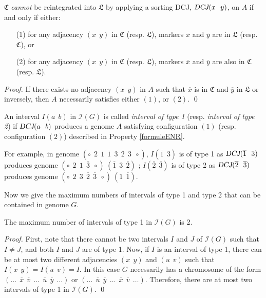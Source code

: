 \documentclass{llncs}
\newcommand{\fst}[1]{ \ensuremath{#1} }
\newcommand{\snd}[1]{ \ensuremath{\overline{#1}} }
\newcommand\aff[2]{\ensuremath{(\fst{#1}~~\fst{#2})}}
\newcommand\asf[2]{\ensuremath{(\snd{#1}~~\fst{#2})}}
\newcommand\ass[2]{\ensuremath{(\snd{#1}~~\snd{#2})}}
\def\DCJ{\ensuremath{\mbox{\sl DCJ}}}
\begin{document}
\begin{property}
$\mathfrak{C}$ \emph{cannot} be reintegrated into $\mathfrak{L}$ by
applying a sorting DCJ,  $\DCJ\aff{x}{y}$, on $A$ if and only if either:

\begin{itemize} 
\item[(1)] for any adjacency $\aff{x}{y}$ in $\mathfrak{C}$
  (resp. $\mathfrak{L}$), markers $\snd{x}$ and $\snd{y}$ are in
  $\mathfrak{L}$ (resp. $\mathfrak{C}$), or

\item[(2)] for any adjacency $\aff{x}{y}$ in $\mathfrak{C}$ (resp. $\mathfrak{L}$), markers $\snd{x}$ and $\snd{y}$ are also in $\mathfrak{C}$ (resp. $\mathfrak{L}$). \end{itemize}

\label{formuleENR}
\end{property}
\begin{proof}
If there exists no  adjacency $\aff{x}{y}$ in $A$ such that $\snd{x}$ is in $\mathfrak{C}$ and $\snd{y}$ in $\mathfrak{L}$ or inversely, then $A$ necessarily satisfies either $(1)$, or $(2)$. \qed
\end{proof}






\begin{definition}
An interval $I\aff{a}{b}$ in  $\mathcal{I}(G)$ is called
\emph{interval of type 1} (resp. \emph{interval of type 2}) if $\DCJ\aff{a}{b}$ produces a genome $A$ satisfying configuration $(1)$  (resp.  configuration $(2)$) described in Property \ref{formuleENR}.
\end{definition}


For example, in genome  $(\circ~~\fst{2}~~\fst{1}~~\snd{1}~~\fst{3}~~\snd{2}~~\snd{3}~~\circ)$,  $I\asf{1}{3}$ is of type 1 as  $\DCJ\asf{1}{3}$ produces genome 
$(\circ~~\fst{2}~~\fst{1}~~\snd{3}~~\circ) ~ (\snd{1}~~\fst{3}~~\snd{2})$ ;  $I\ass{2}{3}$ is of type 2 as  $\DCJ\ass{2}{3}$ produces genome  $(\circ~~\fst{2}~~\fst{3}~~\snd{2}~~\snd{3}~~\circ) ~ (\fst{1}~~\snd{1})$.

Now we give the maximum numbers of intervals of type 1 and type 2 that can be contained in genome $G$.

\begin{lemma}
The maximum number of intervals of type 1 in $\mathcal{I}(G)$ is 2.
\label{maxType1}
\end{lemma}

\begin{proof}
First, note that there cannot be two intervals $I$ and $J$ of $\mathcal{I}(G)$ 
such that $I \neq J$, and both  $I$ and $J$ are of type 1.
Now, if $I$ is an interval of type 1, there can be at most two different 
adjacencies $\aff{x}{y}$ and $\aff{u}{v}$ such that 
$I\aff{x}{y} = I\aff{u}{v} = I$. In this case $G$ necessarily has a chromosome of the form $(\ldots ~~\snd{x}~~\snd{v}~~\ldots ~~\snd{u}~~\snd{y}~~\ldots)$ or $(\ldots ~~\snd{u}~~\snd{y}~~\ldots ~~\snd{x}~~\snd{v}~~\ldots)$.
Therefore, there are at most two intervals of type 1 in $\mathcal{I}(G)$.   \qed




\end{proof}
\end{document}
